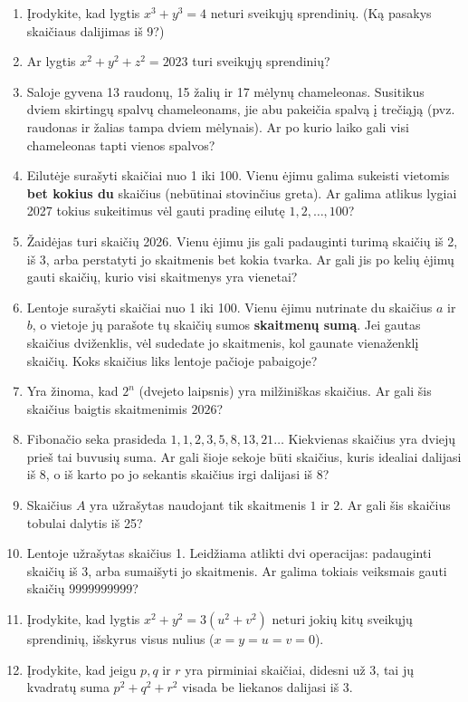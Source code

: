 \documentclass[11pt,a4paper]{scrartcl}
\begin{document}
\begin{enumerate}
    \item Įrodykite, kad lygtis $x^3 + y^3 = 4$ neturi sveikųjų sprendinių. (Ką pasakys skaičiaus dalijimas iš 9?)
    \item Ar lygtis $x^2 + y^2 + z^2 = 2023$ turi sveikųjų sprendinių?
    \item Saloje gyvena 13 raudonų, 15 žalių ir 17 mėlynų chameleonas. Susitikus dviem skirtingų spalvų chameleonams, jie abu pakeičia spalvą į trečiąją (pvz. raudonas ir žalias tampa dviem mėlynais). Ar po kurio laiko gali visi chameleonas tapti vienos spalvos?
    \item Eilutėje surašyti skaičiai nuo 1 iki 100. Vienu ėjimu galima sukeisti vietomis \textbf{bet kokius du} skaičius (nebūtinai stovinčius greta). Ar galima atlikus lygiai 2027 tokius sukeitimus vėl gauti pradinę eilutę $1, 2, \dots, 100$?
    \item Žaidėjas turi skaičių 2026. Vienu ėjimu jis gali padauginti turimą skaičių iš 2, iš 3, arba perstatyti jo skaitmenis bet kokia tvarka. Ar gali jis po kelių ėjimų gauti skaičių, kurio visi skaitmenys yra vienetai?
    \item Lentoje surašyti skaičiai nuo 1 iki 100. Vienu ėjimu nutrinate du skaičius $a$ ir $b$, o vietoje jų parašote tų skaičių sumos \textbf{skaitmenų sumą}. Jei gautas skaičius dviženklis, vėl sudedate jo skaitmenis, kol gaunate vienaženklį skaičių. Koks skaičius liks lentoje pačioje pabaigoje?
    \item Yra žinoma, kad $2^n$ (dvejeto laipsnis) yra milžiniškas skaičius. Ar gali šis skaičius baigtis skaitmenimis $2026$?
    \item Fibonačio seka prasideda $1, 1, 2, 3, 5, 8, 13, 21 \dots$ Kiekvienas skaičius yra dviejų prieš tai buvusių suma. Ar gali šioje sekoje būti skaičius, kuris idealiai dalijasi iš 8, o iš karto po jo sekantis skaičius irgi dalijasi iš 8?
    \item Skaičius $A$ yra užrašytas naudojant tik skaitmenis $1$ ir $2$. Ar gali šis skaičius tobulai dalytis iš 25?
    \item Lentoje užrašytas skaičius 1. Leidžiama atlikti dvi operacijas: padauginti skaičių iš 3, arba sumaišyti jo skaitmenis. Ar galima tokiais veiksmais gauti skaičių $9999999999$?
    \item Įrodykite, kad lygtis $x^2 + y^2 = 3(u^2 + v^2)$ neturi jokių kitų sveikųjų sprendinių, išskyrus visus nulius ($x=y=u=v=0$).
    \item Įrodykite, kad jeigu $p, q$ ir $r$ yra pirminiai skaičiai, didesni už 3, tai jų kvadratų suma $p^2 + q^2 + r^2$ visada be liekanos dalijasi iš 3.

\end{enumerate}
\end{document}
